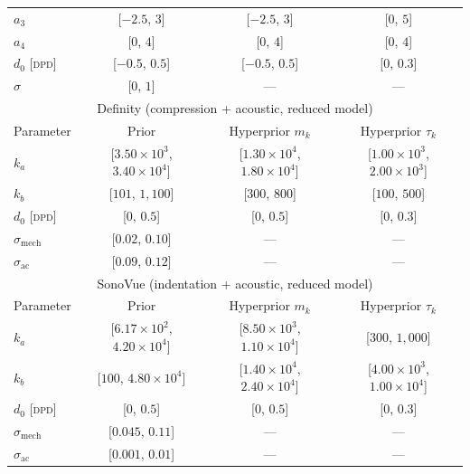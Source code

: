 \documentclass[%
 aip,
 jcp,
 amsmath,amssymb,
 preprint,%
]{revtex4-1}
\begin{document}
\begin{table}[!htbp]
\begin{ruledtabular}
\begin{tabular}{lccc}
$a_3$ & [$-2.5$, $3$] & [$-2.5$, $3$] & [$0$, $5$] \\
$a_4$ & [$0$, $4$] & [$0$, $4$] & [$0$, $4$] \\
$d_0$ [\textsc{dpd}] & [$-0.5$, $0.5$] & [$-0.5$, $0.5$] & [$0$, $0.3$] \\
$\sigma$ & [$0$, $1$] & --- & --- \\
\hline
\multicolumn{4}{c}{Definity (compression + acoustic, reduced model)} \\
\hline
Parameter & Prior & Hyperprior $m_k$ & Hyperprior $\tau_k$ \\
\hline
$k_a$ & [$3.50{\times}10^3$, $3.40{\times}10^4$] & [$1.30{\times}10^4$, $1.80{\times}10^4$] & [$1.00{\times}10^3$, $2.00{\times}10^3$] \\
$k_b$ & [$101$, $1,100$] & [$300$, $800$] & [$100$, $500$] \\
$d_0$ [\textsc{dpd}] & [$0$, $0.5$] & [$0$, $0.5$] & [$0$, $0.3$] \\
$\sigma_{\mathrm{mech}}$ & [$0.02$, $0.10$] & --- & --- \\
$\sigma_{\mathrm{ac}}$ & [$0.09$, $0.12$] & --- & --- \\
\hline
\multicolumn{4}{c}{SonoVue (indentation + acoustic, reduced model)} \\
\hline
Parameter & Prior & Hyperprior $m_k$ & Hyperprior $\tau_k$ \\
\hline
$k_a$ & [$6.17{\times}10^2$, $4.20{\times}10^4$] & [$8.50{\times}10^3$, $1.10{\times}10^4$] & [$300$, $1,000$] \\
$k_b$ & [$100$, $4.80{\times}10^4$] & [$1.40{\times}10^4$, $2.40{\times}10^4$] & [$4.00{\times}10^3$, $1.00{\times}10^4$] \\
$d_0$ [\textsc{dpd}] & [$0$, $0.5$] & [$0$, $0.5$] & [$0$, $0.3$] \\
$\sigma_{\mathrm{mech}}$ & [$0.045$, $0.11$] & --- & --- \\
$\sigma_{\mathrm{ac}}$ & [$0.001$, $0.01$] & --- & --- \\
\end{tabular}
\end{ruledtabular}
\end{table}
\end{document}
